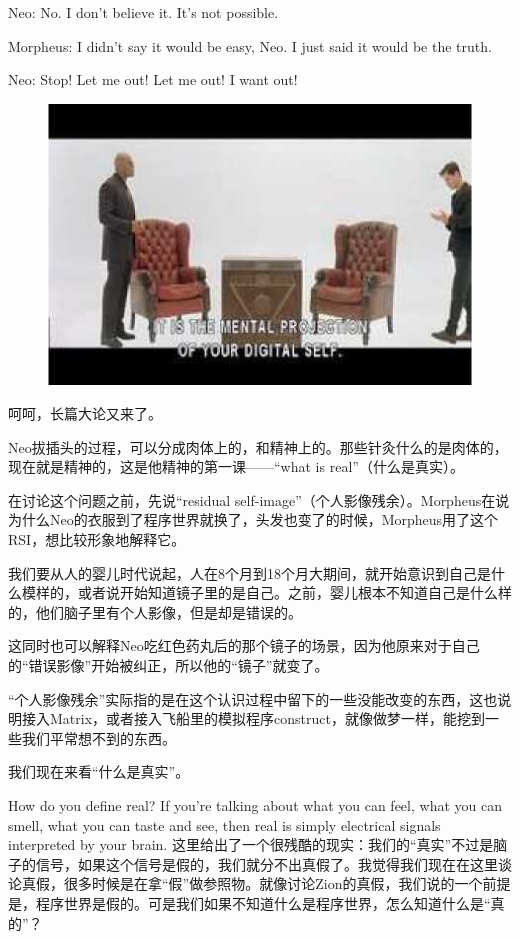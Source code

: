 \documentclass[UTF8]{ctexart}
\newenvironment{myquote}{\color{green} \setlength{\leftskip}{6em} \setlength{\rightskip}{4em} \setlength{\parindent}{-2em}}{\par}
\begin{document}
\begin{myquote}
Neo: No. I don't believe it. It's not possible.

Morpheus: I didn't say it would be easy, Neo. I just said it would be the truth.

Neo: Stop! Let me out! Let me out! I want out!
\end{myquote}

\begin{figure}[htb]
\centering
\includegraphics[width=0.5\linewidth]{fig/read_Matrix-29}
\end{figure}

呵呵，长篇大论又来了。

Neo拔插头的过程，可以分成肉体上的，和精神上的。那些针灸什么的是肉体的，现在就是精神的，这是他精神的第一课——“what is real”（什么是真实）。

在讨论这个问题之前，先说“residual self-image”（个人影像残余）。Morpheus在说为什么Neo的衣服到了程序世界就换了，头发也变了的时候，Morpheus用了这个RSI，想比较形象地解释它。

我们要从人的婴儿时代说起，人在8个月到18个月大期间，就开始意识到自己是什么模样的，或者说开始知道镜子里的是自己。之前，婴儿根本不知道自己是什么样的，他们脑子里有个人影像，但是却是错误的。

这同时也可以解释Neo吃红色药丸后的那个镜子的场景，因为他原来对于自己的“错误影像”开始被纠正，所以他的“镜子”就变了。

“个人影像残余”实际指的是在这个认识过程中留下的一些没能改变的东西，这也说明接入Matrix，或者接入飞船里的模拟程序construct，就像做梦一样，能挖到一些我们平常想不到的东西。

我们现在来看“什么是真实”。

How do you define real? If you're talking about what you can feel, what you can smell, what you can taste and see, then real is simply electrical signals interpreted by your brain. 这里给出了一个很残酷的现实：我们的“真实”不过是脑子的信号，如果这个信号是假的，我们就分不出真假了。我觉得我们现在在这里谈论真假，很多时候是在拿“假”做参照物。就像讨论Zion的真假，我们说的一个前提是，程序世界是假的。可是我们如果不知道什么是程序世界，怎么知道什么是“真的”？
\end{document}
